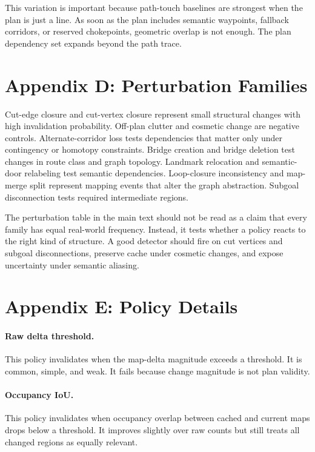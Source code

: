 \documentclass{article}
\begin{document}
This variation is important because path-touch baselines are strongest when the plan is just a line. As soon as the plan includes semantic waypoints, fallback corridors, or reserved chokepoints, geometric overlap is not enough. The plan dependency set expands beyond the path trace.

\section{Appendix D: Perturbation Families}

Cut-edge closure and cut-vertex closure represent small structural changes with high invalidation probability. Off-plan clutter and cosmetic change are negative controls. Alternate-corridor loss tests dependencies that matter only under contingency or homotopy constraints. Bridge creation and bridge deletion test changes in route class and graph topology. Landmark relocation and semantic-door relabeling test semantic dependencies. Loop-closure inconsistency and map-merge split represent mapping events that alter the graph abstraction. Subgoal disconnection tests required intermediate regions.

The perturbation table in the main text should not be read as a claim that every family has equal real-world frequency. Instead, it tests whether a policy reacts to the right kind of structure. A good detector should fire on cut vertices and subgoal disconnections, preserve cache under cosmetic changes, and expose uncertainty under semantic aliasing.

\section{Appendix E: Policy Details}

\paragraph{Raw delta threshold.}
This policy invalidates when the map-delta magnitude exceeds a threshold. It is common, simple, and weak. It fails because change magnitude is not plan validity.

\paragraph{Occupancy IoU.}
This policy invalidates when occupancy overlap between cached and current maps drops below a threshold. It improves slightly over raw counts but still treats all changed regions as equally relevant.
\end{document}

